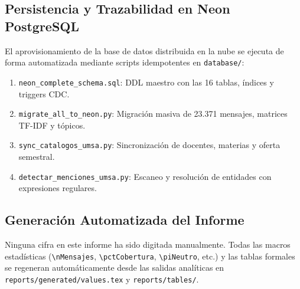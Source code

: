 \subsection{Persistencia y Trazabilidad en Neon PostgreSQL}

El aprovisionamiento de la base de datos distribuida en la nube se ejecuta de forma automatizada mediante scripts idempotentes en \texttt{database/}:
\begin{enumerate}
  \item \texttt{neon\_complete\_schema.sql}: DDL maestro con las 16 tablas, índices y triggers CDC.
  \item \texttt{migrate\_all\_to\_neon.py}: Migración masiva de 23.371 mensajes, matrices TF-IDF y tópicos.
  \item \texttt{sync\_catalogos\_umsa.py}: Sincronización de docentes, materias y oferta semestral.
  \item \texttt{detectar\_menciones\_umsa.py}: Escaneo y resolución de entidades con expresiones regulares.
\end{enumerate}

\subsection{Generación Automatizada del Informe}

Ninguna cifra en este informe ha sido digitada manualmente. Todas las macros estadísticas (\texttt{\textbackslash nMensajes}, \texttt{\textbackslash pctCobertura}, \texttt{\textbackslash piNeutro}, etc.) y las tablas formales se regeneran automáticamente desde las salidas analíticas en \texttt{reports/generated/values.tex} y \texttt{reports/tables/}.
